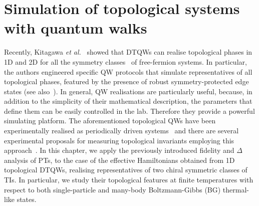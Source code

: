 %
%
%
%
%
%

\chapter{Simulation of topological systems with quantum walks}

Recently, Kitagawa {\em et al.}~\cite{kit:rud:ber:dem:10} showed that DTQWs can realise topological phases in 1D and 2D for all the symmetry classes~\cite{sch:ryu:fur:lud:08,kit:09} of free-fermion systems. In particular, the authors engineered specific QW protocols that simulate representatives of all topological phases, featured by the presence of robust symmetry-protected edge states (see also~\cite{kit:12}). In general, QW realisations are particularly useful, because, in addition to the simplicity of their mathematical description, the parameters that define them can be easily controlled in the lab. Therefore they provide a powerful simulating platform. The aforementioned topological QWs have been experimentally realised as periodically driven systems~\cite{kit:exp:12} and there are several experimental proposals for measuring topological invariants  employing this approach~\cite{rak:asb:alb:16,gro:bra:alt:mes:asb:16,mug:cel:mas:asb:lew:lob:16}.
In this chapter, we apply the previously introduced fidelity and $\Delta$ analysis of PTs, to the case of the effective Hamiltonians obtained from 1D topological DTQWs, realising representatives of two chiral symmetric classes of TIs.
In particular, we study their topological features at finite temperatures with respect to both single-particle and many-body Boltzmann-Gibbs (BG) thermal-like states.


